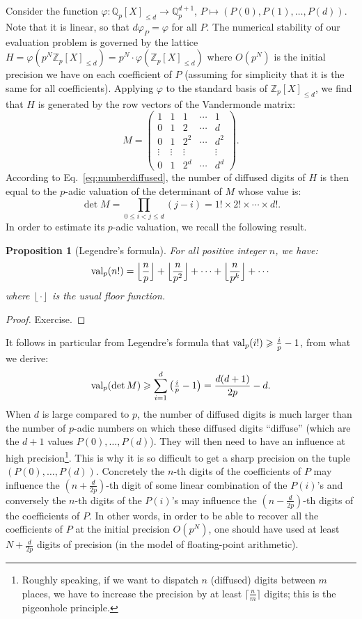 \documentclass[11pt]{article}
\numberwithin{equation}{section}
\numberwithin{figure}{section}
\renewcommand{\leq}{\leqslant}
\renewcommand{\geq}{\geqslant}
\newtheorem{prop}[theo]{Proposition}
\theoremstyle{definition}
\newcommand{\Z}{\mathbb Z}
\newcommand{\Zp}{\Z_p}
\newcommand{\Q}{\mathbb Q}
\newcommand{\Qp}{\Q_p}
\newcommand{\val}{\text{\rm val}}
\begin{document}
Consider the function $\varphi : \Qp[X]_{\leq d} \to \Qp^{d+1}$, $P 
\mapsto (P(0), P(1), \ldots, P(d))$. Note that it is linear, so that $d 
\varphi_P = \varphi$ for all $P$. 
The numerical stability of our evaluation problem is governed by
the lattice
$H = \varphi(p^N \Zp[X]_{\leq d}) = p^N \cdot \varphi(\Zp[X]_{\leq d})$
where $O(p^N)$ is the initial precision we have on each coefficient of
$P$ (assuming for simplicity that it is the same for all coefficients).
Applying $\varphi$ to the standard basis of $\Zp[X]_{\leq d}$, we find
that $H$ is generated by the row vectors of the Vandermonde matrix:
$$M = \left( \begin{matrix}
1 & 1 & 1 & \cdots & 1 \\
0 & 1 & 2 & \cdots & d \\
0 & 1 & 2^2 & \cdots & d^2 \\
\vdots & \vdots & \vdots & & \vdots \\
0 & 1 & 2^d & \cdots & d^d
\end{matrix} \right).$$
According to Eq.~\eqref{eq:numberdiffused}, the number of diffused
digits of $H$ is then equal to the $p$-adic valuation of the
determinant of $M$ whose value is:
$$\det M = \prod_{0 \leq i < j \leq d} (j-i) = 1! \times 2! \times 
\cdots \times d!.$$
In order to estimate its $p$-adic valuation, we recall the following
result.

\begin{prop}[Legendre's formula]
For all positive integer $n$, we have:
$$\val_p(n!) = \Big\lfloor\frac n p\Big\rfloor + \Big\lfloor\frac n {p^2}\Big\rfloor + \cdots +
\Big\lfloor\frac n {p^k}\Big\rfloor + \cdots$$
where $\left\lfloor\cdot\right\rfloor$ is the usual floor function.
\end{prop}

\begin{proof}
Exercise.
\end{proof}

It follows in particular from Legendre's formula that $\val_p(i!) \geq
\frac i p - 1$, from what we derive:
$$\val_p(\det M) \geq \sum_{i=1}^d {\textstyle \big(\frac i p - 1\big)}
= \frac{d(d+1)}{2p} - d.$$
When $d$ is large compared to $p$, the number of diffused digits
is much larger than the 
number of $p$-adic numbers on which these diffused digits ``diffuse'' 
(which are the $d{+}1$ values $P(0), \ldots, P(d)$). They
will then need to have an influence at high 
precision\footnote{Roughly speaking, if we want to dispatch $n$ 
(diffused) digits 
between $m$ places, we have to increase the precision by at least $\lceil
\frac n m\rceil$ digits; this is the pigeonhole principle.}. This is why it is so 
difficult to get a sharp precision on the tuple $(P(0), \ldots, P(d))$. Concretely the 
$n$-th digits of the coefficients of $P$ may influence the $(n+\frac 
d{2p})$-th digit of some linear combination of the $P(i)$'s and 
conversely the $n$-th digits of the $P(i)$'s may influence the $(n-\frac 
d{2p})$-th digits of the coefficients of $P$. In other words, in order 
to be able to recover all the coefficients of $P$ at the initial 
precision $O(p^N)$, one should have used at least $N+\frac d{2p}$ digits 
of precision (in the model of floating-point arithmetic).
\end{document}
